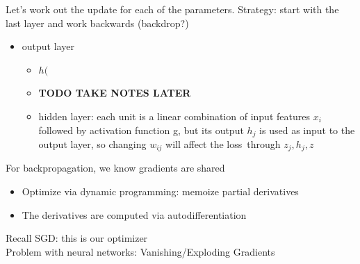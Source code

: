 \documentclass[10pt, oneside]{article}
\begin{document}
Let's work out the update for each of the parameters. Strategy: start with the last layer and work backwards (backdrop?)
\begin{itemize}
    \item output layer
    \begin{itemize}
        \item $h($
        \item \textbf{TODO TAKE NOTES LATER}
        \item hidden layer: each unit is a linear combination of input features $x_i$ followed by activation function g, but its output $h_j$ is used as input to the output layer, so changing $w_{ij}$ will affect the loss through $z_j, h_j, z$
    \end{itemize}
\end{itemize}
For backpropagation, we know gradients are shared
\begin{itemize}
    \item Optimize via dynamic programming: memoize partial derivatives
    \item The derivatives are computed via autodifferentiation
\end{itemize}
Recall SGD: this is our optimizer\\
Problem with neural networks: Vanishing/Exploding Gradients
\end{document}
